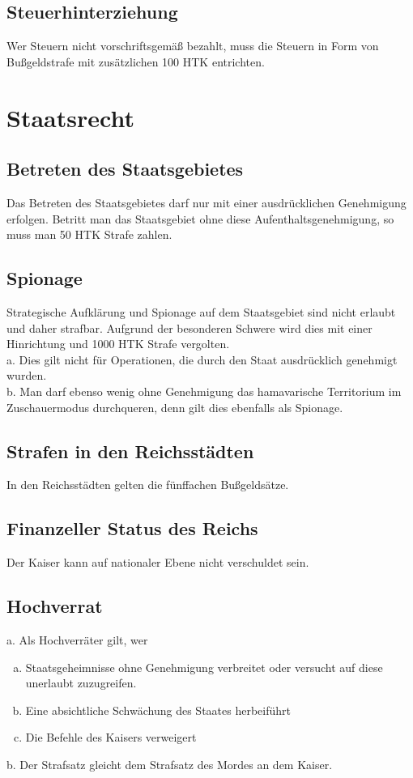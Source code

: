 \documentclass{article}
\begin{document}
\subsection{Steuerhinterziehung}\label{hinterz}
Wer Steuern nicht vorschriftsgemäß bezahlt, muss die Steuern in Form von Bußgeldstrafe mit zusätzlichen 100 HTK entrichten.

\section{Staatsrecht}

\subsection{Betreten des Staatsgebietes}
Das Betreten des Staatsgebietes darf nur mit einer ausdrücklichen Genehmigung erfolgen. Betritt man das Staatsgebiet ohne diese Aufenthaltsgenehmigung, so muss man 50 HTK Strafe zahlen.

\subsection{Spionage}
Strategische Aufklärung und Spionage auf dem Staatsgebiet sind nicht erlaubt und daher strafbar. Aufgrund der besonderen Schwere wird dies mit einer Hinrichtung und 1000 HTK Strafe vergolten.\\
a. Dies gilt nicht für Operationen, die durch den Staat ausdrücklich genehmigt wurden. \\
b. Man darf ebenso wenig ohne Genehmigung das hamavarische Territorium im Zuschauermodus durchqueren, denn gilt dies ebenfalls als Spionage.

\subsection{Strafen in den Reichsstädten}
In den Reichsstädten gelten die fünffachen Bußgeldsätze.

\subsection{Finanzeller Status des Reichs}
Der Kaiser kann auf nationaler Ebene nicht verschuldet sein.

\subsection{Hochverrat}
a.	Als Hochverräter gilt, wer
\begin{enumerate}[a)]
	\item Staatsgeheimnisse ohne Genehmigung verbreitet oder versucht auf diese unerlaubt zuzugreifen.
	\item Eine absichtliche Schwächung des Staates herbeiführt
	\item Die Befehle des Kaisers verweigert
\end{enumerate}
b.	Der Strafsatz gleicht dem Strafsatz des Mordes an dem Kaiser.
\end{document}
